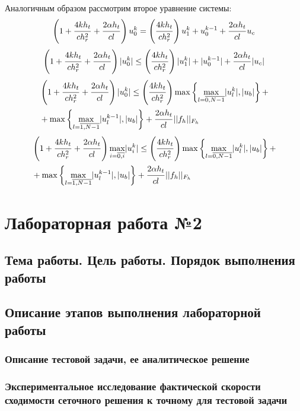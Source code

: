\documentclass[a4paper,12pt,russian, fleqn]{extreport}
\begin{document}
	Аналогичным образом рассмотрим второе уравнение системы:
	\begin{align}
		\left( 1 + \dfrac{\strut 4kh_t}{\strut ch_r^2} + \dfrac{\strut 2\alpha h_t}{\strut cl} \right)u_0^k = \left(\dfrac{\strut 4kh_t}{\strut ch_r^2}\right)u_1^{k} + u_0^{k-1} + \dfrac{\strut 2\alpha h_t}{\strut cl}u_c \nonumber
	\end{align}
	\begin{align}
		\left( 1 + \dfrac{\strut 4kh_t}{\strut ch_r^2} + \dfrac{\strut 2\alpha h_t}{\strut cl} \right)\lvert u_0^k \rvert \leq \left(\dfrac{\strut 4kh_t}{\strut ch_r^2}\right) \lvert u_1^{k} \rvert + \lvert u_0^{k-1} \rvert + \dfrac{\strut 2\alpha h_t}{\strut cl} \lvert u_c \rvert \nonumber
	\end{align}
	\begin{align}
		& \left( 1 + \dfrac{\strut 4kh_t}{\strut ch_r^2} + \dfrac{\strut 2\alpha h_t}{\strut cl} \right)\lvert u_0^k \rvert \leq \left(\dfrac{\strut 4kh_t}{\strut ch_r^2}\right) \max\left\{\max\limits_{l = \overline{0, N-1}}\lvert u_l^k \rvert, \lvert u_b \rvert \right\} + \nonumber \\
		& + \max\left\{\max\limits_{l = \overline{1, N-1}}\lvert u_l^{k-1} \rvert, \lvert u_b \rvert \right\} + \dfrac{\strut 2\alpha h_t}{\strut cl} \lvert\lvert f_h \rvert\rvert_{F_h} \nonumber
	\end{align}
	\begin{align}
		& \left( 1 + \dfrac{\strut 4kh_t}{\strut ch_r^2} + \dfrac{\strut 2\alpha h_t}{\strut cl} \right)\max\limits_{i=\overline{0,i}}\lvert u^k_i\rvert \leq \left(\dfrac{\strut 4kh_t}{\strut ch_r^2}\right) \max\left\{\max\limits_{l = \overline{0, N-1}}\lvert u_l^k \rvert, \lvert u_b \rvert \right\} + \nonumber \\
		& + \max\left\{\max\limits_{l = \overline{1, N-1}}\lvert u_l^{k-1} \rvert, \lvert u_b \rvert \right\} + \dfrac{\strut 2\alpha h_t}{\strut cl} \lvert\lvert f_h \rvert\rvert_{F_h} \nonumber
	\end{align}
	\chapter{Лабораторная работа №2}
	\section{Тема работы. Цель работы. Порядок выполнения работы}
	\section{Описание этапов выполнения лабораторной работы}
	\subsection{Описание тестовой задачи, ее аналитическое решение}
	\subsection{Экспериментальное исследование фактической скорости сходимости сеточного решения к точному для тестовой задачи}
\end{document}
